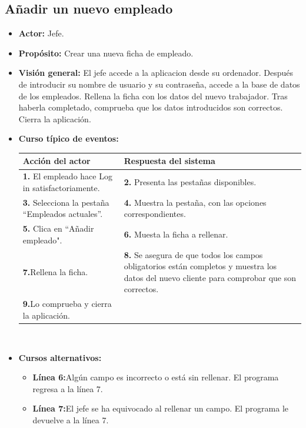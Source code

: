 \documentclass[spanish,a4paper,11pt, twoside]{report}	%
\begin{document}
	\subsection{Añadir un nuevo empleado}	
			\begin{itemize}
			\item \textbf{Actor:} Jefe.
			\item \textbf{Propósito:} Crear una nueva ficha de empleado.
			\item \textbf{Visión general:} El jefe accede a la aplicacion desde su ordenador. Después de introducir su nombre de usuario y su contraseña, accede a la base de datos de los empleados. Rellena la ficha con los datos del nuevo trabajador. Tras haberla completado, comprueba que los datos introducidos son correctos. Cierra la aplicación. 
			\item \textbf{Curso típico de eventos:} 	\\
				\begin{tabular}{|p{6cm}||p{6cm}|}
				\hline
				\textbf{Acción del actor} & \textbf{Respuesta del sistema} \\ \hline \hline
				\textbf{1.}   El empleado hace Log in satisfactoriamente. & \textbf{2.} Presenta las pestañas disponibles.\\ \hline
				\textbf{3.} Selecciona la pestaña “Empleados actuales”. & \textbf{4.} Muestra la pestaña, con las opciones correspondientes. \\ \hline
				\textbf{5.} Clica en “Añadir empleado".	& \textbf{6.} Muesta la ficha a rellenar. \\ \hline
				\textbf{7.}Rellena la ficha. & \textbf{8.} Se asegura de que todos los campos obligatorios están completos y muestra los datos del nuevo cliente para comprobar que son correctos.\\ \hline
				\textbf{9.}Lo comprueba y cierra la aplicación. & \textbf{} \\ \hline
			\end{tabular}
			\\
			\item \textbf{Cursos alternativos:} 
			\begin{itemize}
			\item  \textbf{Línea 6:}Algún campo es incorrecto o está sin rellenar. El programa regresa a la línea 7.
			\item  \textbf{Línea 7:}El jefe se ha equivocado al rellenar un campo. El programa le devuelve a la línea 7.
			\end {itemize}
		\end{itemize}%
\end{document}

